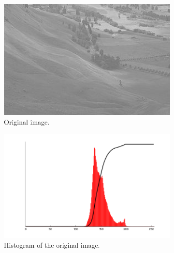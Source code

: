 \documentclass[12pt, twocolumn]{report}
\begin{document}
\begin{figure}[htbp]
    \centering
    \begin{subfigure}{0.4\textwidth}
        \centering
        \includegraphics[width=1\textwidth]{Figures/Histogram equalisation inital image.jpg}
        \caption{Original image.}
        \label{Histogram equalisation inital image}
    \end{subfigure}
    \begin{subfigure}{0.4\textwidth}
        \centering
        \includegraphics[width=1\textwidth]{Figures/Histogram equalisation inital image histogram.png}
        \caption{Histogram of the original image.}
        \label{Histogram equalisation inital image histogram}
    \end{subfigure}
    \begin{subfigure}{0.4\textwidth}
        \centering

\end{subfigure}
\end{figure}
\end{document}
